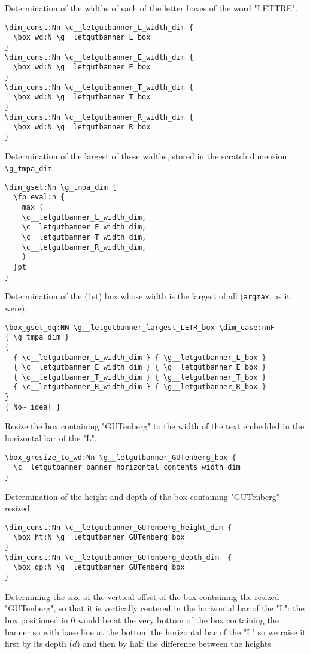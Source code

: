 \documentclass{letgut}
\begin{document}
Determination of the widths of each of the letter boxes of the word "LETTRE".
\begin{lstlisting}
\dim_const:Nn \c__letgutbanner_L_width_dim {
  \box_wd:N \g__letgutbanner_L_box
}
\dim_const:Nn \c__letgutbanner_E_width_dim {
  \box_wd:N \g__letgutbanner_E_box
}
\dim_const:Nn \c__letgutbanner_T_width_dim {
  \box_wd:N \g__letgutbanner_T_box
}
\dim_const:Nn \c__letgutbanner_R_width_dim {
  \box_wd:N \g__letgutbanner_R_box
}
\end{lstlisting}
Determination of the largest of these widths, stored in the scratch dimension
\lstinline+\g_tmpa_dim+.
\begin{lstlisting}
\dim_gset:Nn \g_tmpa_dim {
  \fp_eval:n {
    max (
    \c__letgutbanner_L_width_dim,
    \c__letgutbanner_E_width_dim,
    \c__letgutbanner_T_width_dim,
    \c__letgutbanner_R_width_dim,
    )
  }pt
}
\end{lstlisting}
Determination of the (1st) box whose width is the largest of all (\lstinline+argmax+, as
it were).
\begin{lstlisting}
\box_gset_eq:NN \g__letgutbanner_largest_LETR_box \dim_case:nnF
{ \g_tmpa_dim }
{
  { \c__letgutbanner_L_width_dim } { \g__letgutbanner_L_box }
  { \c__letgutbanner_E_width_dim } { \g__letgutbanner_E_box }
  { \c__letgutbanner_T_width_dim } { \g__letgutbanner_T_box }
  { \c__letgutbanner_R_width_dim } { \g__letgutbanner_R_box }
}
{ No~ idea! }
\end{lstlisting}
Resize the box containing "GUTenberg" to the width of the text embedded in the
horizontal bar of the "L".
\begin{lstlisting}
\box_gresize_to_wd:Nn \g__letgutbanner_GUTenberg_box {
  \c__letgutbanner_banner_horizontal_contents_width_dim
}
\end{lstlisting}
Determination of the height and depth of the box containing "GUTenberg" resized.
\begin{lstlisting}
\dim_const:Nn \c__letgutbanner_GUTenberg_height_dim {
  \box_ht:N \g__letgutbanner_GUTenberg_box
}
\dim_const:Nn \c__letgutbanner_GUTenberg_depth_dim  {
  \box_dp:N \g__letgutbanner_GUTenberg_box
}
\end{lstlisting}
Determining the size of the vertical offset of the box containing the resized
"GUTenberg", so that it is vertically centered in the horizontal bar of the "L":
the box positioned in \(0\) would be at the very bottom of the box containing the
banner so with base line at the bottom the horizontal bar of the "L" so we raise
it first by its depth (\(d\)) and then by half the difference between the heights
\end{document}
